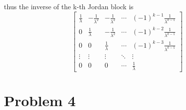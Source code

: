 \documentclass[12pt,a4paper]{article}
\begin{document}
thus the inverse of the k-th Jordan block is
\[
    \begin{bmatrix}
        \frac{1}{\lambda} &- \frac{1}{\lambda^2} & -\frac{1}{\lambda^2} & \cdots & (-1)^{k-1} \frac{1}{\lambda^{k-1}} \\
        0                 & \frac{1}{\lambda}     & -\frac{1}{\lambda^2} & \cdots & (-1)^{k-2} \frac{1}{\lambda^{k-1}} \\
        0                 & 0                     & \frac{1}{\lambda}     & \cdots & (-1)^{k-3} \frac{1}{\lambda^{k-1}} \\
        \vdots            & \vdots                & \vdots                & \ddots & \vdots \\
        0                 & 0                     & 0                     & \cdots & \frac{1}{\lambda}
    \end{bmatrix}
\]

\section{Problem 4}
\end{document}
